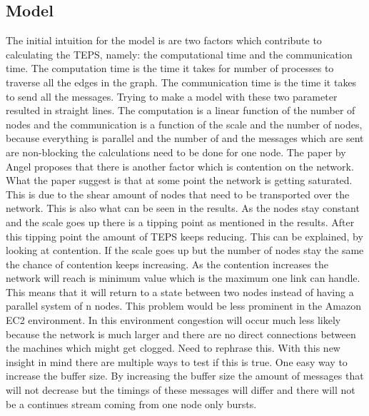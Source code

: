 \subsection{Model}
The initial intuition for the model is are two factors which contribute to calculating the TEPS, namely: the computational time and the communication time. The computation time is the time it takes for number of processes to traverse all the edges in the graph. The communication time is the time it takes to send all the messages. Trying to make a model with these two parameter resulted in straight lines. The computation is a linear function of the number of nodes and the communication is a function of the scale and the number of nodes, because everything is parallel and the number of and the messages which are sent are non-blocking the calculations need to be done for one node.
The paper by Angel proposes that there is another factor which is contention on the network. What the paper suggest is that at some point the network is getting saturated. This is due to the shear amount of nodes that need to be transported over the network. This is also what can be seen in the results. As the nodes stay constant and the scale goes up there is a tipping point as mentioned in the results. After this tipping point the amount of TEPS keeps reducing. This can be explained, by looking at contention. If the scale goes up but the number of nodes stay the same the chance of contention keeps increasing. As the contention increases the network will reach is minimum value which is the maximum one link can handle. This means that it will return to a state between two nodes instead of having a parallel system of n nodes.
This problem would be less prominent in the Amazon EC2 environment. In this environment congestion will occur much less likely because the network is much larger and there are no direct connections between the machines which might get clogged. Need to rephrase this.
With this new insight in mind there are multiple ways to test if this is true. One easy way to increase the buffer size. By increasing the buffer size the amount of messages that will not decrease but the timings of these messages will differ and there will not be a continues stream coming from one node only bursts.



 